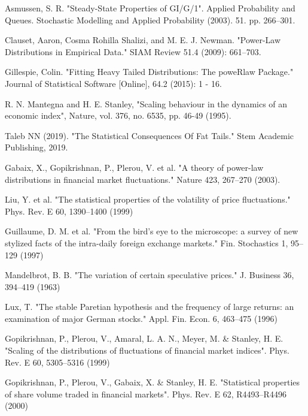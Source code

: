 \documentclass[11pt,a4paper,oldfontcommands]{memoir}
\begin{document}
{\clearpage

\begin{thebibliography}{39}

Asmussen, S. R. "Steady-State Properties of GI/G/1". Applied Probability and Queues. Stochastic Modelling and Applied Probability (2003). 51. pp. 266–301.

Clauset, Aaron, Cosma Rohilla Shalizi, and M. E. J. Newman. "Power-Law Distributions in Empirical Data." SIAM Review 51.4 (2009): 661–703.

Gillespie, Colin. "Fitting Heavy Tailed Distributions: The poweRlaw Package." Journal of Statistical Software [Online], 64.2 (2015): 1 - 16. 

R. N. Mantegna and H. E. Stanley, "Scaling behaviour in the dynamics of an economic index", Nature, vol. 376, no. 6535, pp. 46-49 (1995). 

Taleb NN (2019). "The Statistical Consequences Of Fat Tails." Stem Academic Publishing, 2019.

Gabaix, X., Gopikrishnan, P., Plerou, V. et al. "A theory of power-law distributions in financial market fluctuations." Nature 423, 267–270 (2003). 

Liu, Y. et al. "The statistical properties of the volatility of price fluctuations." Phys. Rev. E 60, 1390–1400 (1999)

Guillaume, D. M. et al. "From the bird's eye to the microscope: a survey of new stylized facts of the intra-daily foreign exchange markets." Fin. Stochastics 1, 95–129 (1997)

Mandelbrot, B. B. "The variation of certain speculative prices." J. Business 36, 394–419 (1963)

Lux, T. "The stable Paretian hypothesis and the frequency of large returns: an examination of major German stocks." Appl. Fin. Econ. 6, 463–475 (1996)

Gopikrishnan, P., Plerou, V., Amaral, L. A. N., Meyer, M. & Stanley, H. E. "Scaling of the distributions of fluctuations of financial market indices". Phys. Rev. E 60, 5305–5316 (1999)

Gopikrishnan, P., Plerou, V., Gabaix, X. & Stanley, H. E. "Statistical properties of share volume traded in financial markets". Phys. Rev. E 62, R4493–R4496 (2000)


\end{thebibliography}}
\end{document}
